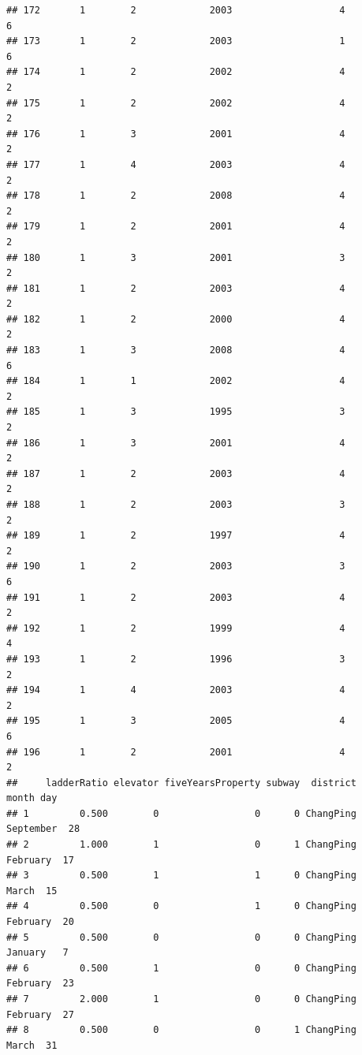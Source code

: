 \documentclass[
]{article}
\begin{document}
\begin{verbatim}
## 172       1        2             2003                   4                 6
## 173       1        2             2003                   1                 6
## 174       1        2             2002                   4                 2
## 175       1        2             2002                   4                 2
## 176       1        3             2001                   4                 2
## 177       1        4             2003                   4                 2
## 178       1        2             2008                   4                 2
## 179       1        2             2001                   4                 2
## 180       1        3             2001                   3                 2
## 181       1        2             2003                   4                 2
## 182       1        2             2000                   4                 2
## 183       1        3             2008                   4                 6
## 184       1        1             2002                   4                 2
## 185       1        3             1995                   3                 2
## 186       1        3             2001                   4                 2
## 187       1        2             2003                   4                 2
## 188       1        2             2003                   3                 2
## 189       1        2             1997                   4                 2
## 190       1        2             2003                   3                 6
## 191       1        2             2003                   4                 2
## 192       1        2             1999                   4                 4
## 193       1        2             1996                   3                 2
## 194       1        4             2003                   4                 2
## 195       1        3             2005                   4                 6
## 196       1        2             2001                   4                 2
##     ladderRatio elevator fiveYearsProperty subway  district     month day
## 1         0.500        0                 0      0 ChangPing September  28
## 2         1.000        1                 0      1 ChangPing  February  17
## 3         0.500        1                 1      0 ChangPing     March  15
## 4         0.500        0                 1      0 ChangPing  February  20
## 5         0.500        0                 0      0 ChangPing   January   7
## 6         0.500        1                 0      0 ChangPing  February  23
## 7         2.000        1                 0      0 ChangPing  February  27
## 8         0.500        0                 0      1 ChangPing     March  31

\end{verbatim}
\end{document}

